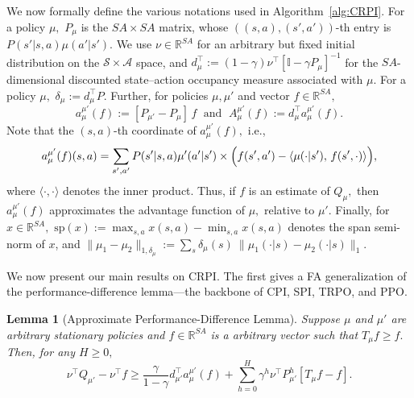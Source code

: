 \documentclass[twoside]{article}
\theoremstyle{plain}
\newtheorem{lemma}[theorem]{Lemma}
\theoremstyle{definition}
\theoremstyle{remark}
\renewcommand{\sp}{\mathrm{sp}}
\newcommand{\tr}{\top}
\newcommand{\bI}{\mathbb{I}}
\newcommand{\bR}{\mathbb{R}}
\newcommand{\ap}{a'}
\newcommand{\stp}{s'}
\newcommand{\mup}{\mu'}
\newcommand{\CRPI}{CRPI}
\newcommand{\cA}{\mathcal{A}}
\newcommand{\cS}{\mathcal{S}}
\begin{document}
We now formally define the various notations used in Algorithm~\ref{alg:CRPI}. For a policy $\mu,$  
$P_{\mu}$ is the $SA \times SA$ matrix, whose $((s, a), (\stp, \ap))$-th entry is $P(\stp|s, a) \mu(\ap|\stp).$ We use $\nu \in \bR^{SA}$ for an arbitrary but fixed initial distribution on the $\cS \times \cA$ space, and $d_{\mu}^\tr := (1 - \gamma) \nu^\tr[\bI - \gamma P_{\mu}]^{-1}$ for the $SA$-dimensional discounted state–action occupancy measure associated with $\mu.$ For a policy $\mu,$ $\delta_{\mu} := d_{\mu}^\tr P.$ Further, for policies $\mu, \mup$ and  vector $f \in \bR^{SA},$
%
\begin{equation}
    \label{e:a.mu.mup.defn}
    a_{\mu}^{\mup}(f) := [P_{\mup}- P_{\mu}]\,f \; \text{ and } \;     A_{\mu}^{\mup}(f) := d_{\mu}^\tr  a_{\mu}^{\mup}(f).
\end{equation}
%
Note that the $(s, a)$-th coordinate of $a_{\mu}^{\mup}(f),$ i.e.,  
%
\begin{equation}
    \label{e:a.mu.mup.s.a.defn}
    a_{\mu}^{\mup}(f)(s, a) = \sum_{s', \ap} P(\stp|s,a)  \mup(a'|s')
    \times \Bigl(
    f(s',a') - \langle \mu(\cdot|s'),\, f(s',\cdot)\rangle \Bigr),
\end{equation}
%
where $\langle \cdot, \cdot \rangle$ denotes the inner product. Thus, if $f$ is an estimate of $Q_{\mu},$ then $a_{\mu}^{\mup}(f)$ approximates the advantage function of $\mu,$ relative to $\mup.$ Finally, for $x \in \bR^{SA},$ 
$\sp(x) := \max_{s, a} x(s, a) - \min_{s, a} x(s, a)$ denotes the span semi-norm of $x$, and $\|\mu_1 - \mu_2\|_{1, \delta_{\mu}} := \sum_{s} \delta_\mu(s)\  \|\mu_1(\cdot|s) - \mu_2(\cdot|s)\|_1.$ 
%

We now present our main results on \CRPI. The first gives a FA generalization of the performance-difference lemma---the backbone of CPI, SPI, TRPO, and PPO.

\begin{lemma}[Approximate Performance-Difference Lemma]
\label{lem:Approx.Performance.Diff.Lemma}
%
Suppose $\mu$ and $\mup$ are arbitrary stationary policies and $f \in \bR^{SA}$ is a arbitrary vector such that $T_{\mu} f \geq f.$ Then, for any $H \geq 0,$
%
%
%
\begin{equation}
\label{e:approx.Perf.Diff.Lemma.inequality}
    \nu^\tr Q_{\mup} - \nu^\tr f 
    \geq  \frac{\gamma}{1 - \gamma} d_{\mup}^\tr  a_{\mu}^{\mup}(f)  +   \sum_{h = 0}^H \gamma^h \nu^\tr P_{\mup}^h [T_{\mu}f - f].
\end{equation}
%
\end{lemma}
%
\end{document}
